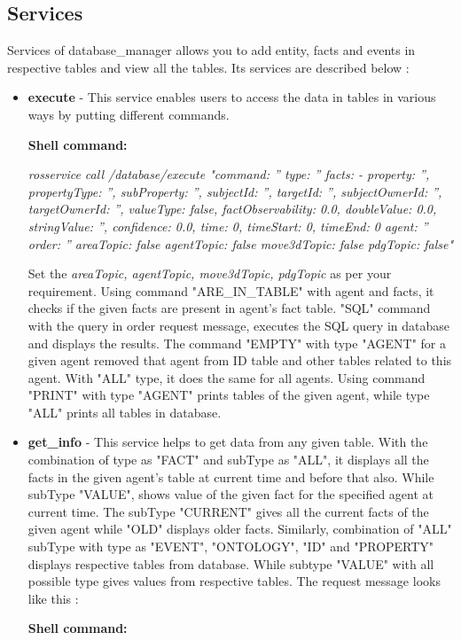 \documentclass[a4paper]{article}
\begin{document}
\subsection{Services}
Services of database\_manager allows you to add entity, facts and events in respective tables and view all the tables. Its services are described below :
\begin{itemize}
\item \textbf {execute} - This service enables users to access the data in tables in various ways by putting different commands.

\textbf{Shell command:}

\textit{rosservice call /database/execute "command: ''
type: ''
facts:
- {property: '', propertyType: '', subProperty: '', subjectId: '', targetId: '', subjectOwnerId: '',
  targetOwnerId: '', valueType: false, factObservability: 0.0, doubleValue: 0.0, stringValue: '',
  confidence: 0.0, time: 0, timeStart: 0, timeEnd: 0}
agent: ''
order: ''
areaTopic: false
agentTopic: false
move3dTopic: false
pdgTopic: false" 
}

Set the \textit{areaTopic, agentTopic, move3dTopic, pdgTopic} as per your requirement. Using command "ARE\_IN\_TABLE" with agent and facts, it checks if the given facts are present in agent's fact table. "SQL" command with the query in order request message, executes the SQL query in database and displays the results. The command "EMPTY" with type "AGENT" for a given agent removed that agent from ID table and other tables related to this agent. With "ALL" type, it does the same for all agents. Using command "PRINT" with type "AGENT" prints tables of the given agent, while type "ALL" prints all tables in database.

\item \textbf {get\_info} - This service helps to get data from any given table. With the combination of type as "FACT" and subType as "ALL", it displays all the facts in the given agent's table at current time and before that also. While subType "VALUE", shows value of the given fact for the specified agent at current time. The subType "CURRENT" gives all the current facts of the given agent while "OLD" displays older facts. Similarly, combination of "ALL" subType with type as "EVENT", "ONTOLOGY", "ID" and "PROPERTY" displays respective tables from database. While subtype "VALUE" with all possible type gives values from respective tables. The request message looks like this :

\textbf{Shell command:}


\end{itemize}
\end{document}
